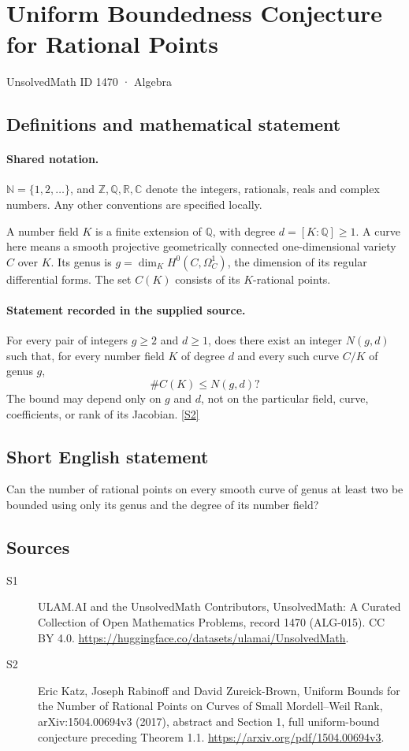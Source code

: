 \documentclass[11pt]{article}
\newcommand{\sref}[2]{\hyperlink{source:#1:#2}{[S#2]}}
\begin{document}
\setcounter{section}{1469}
\section{Uniform Boundedness Conjecture for Rational Points}\label{1470}
{\small\sffamily UnsolvedMath ID 1470 · Algebra}
\subsection{Definitions and mathematical statement}

\paragraph{Shared notation.}$\mathbb N=\{1,2,\ldots\}$, and $\mathbb Z,\mathbb Q,\mathbb R,\mathbb C$ denote the integers, rationals, reals and complex numbers. Any other conventions are specified locally.


A number field $K$ is a finite extension of $\mathbb Q$, with degree $d=[K:\mathbb Q]\ge1$. A curve here means a smooth projective geometrically connected one-dimensional variety $C$ over $K$. Its genus is $g=\dim_K H^0(C,\Omega_C^1)$, the dimension of its regular differential forms. The set $C(K)$ consists of its $K$-rational points.
\paragraph{Statement recorded in the supplied source.}
For every pair of integers $g\ge2$ and $d\ge1$, does there exist an integer $N(g,d)$ such that, for every number field $K$ of degree $d$ and every such curve $C/K$ of genus $g$,
\[
 \#C(K)\le N(g,d)?
\]
The bound may depend only on $g$ and $d$, not on the particular field, curve, coefficients, or rank of its Jacobian. \sref{1470}{2}
\subsection{Short English statement}
Can the number of rational points on every smooth curve of genus at least two be bounded using only its genus and the degree of its number field?
\subsection{Sources}
\begin{description}
\item[\hypertarget{source:1470:1}{S1}] ULAM.AI and the UnsolvedMath Contributors, UnsolvedMath: A Curated Collection of Open Mathematics Problems, record 1470 (ALG-015). CC BY 4.0. \url{https://huggingface.co/datasets/ulamai/UnsolvedMath}.
\item[\hypertarget{source:1470:2}{S2}] Eric Katz, Joseph Rabinoff and David Zureick-Brown, Uniform Bounds for the Number of Rational Points on Curves of Small Mordell–Weil Rank, arXiv:1504.00694v3 (2017), abstract and Section 1, full uniform-bound conjecture preceding Theorem 1.1. \url{https://arxiv.org/pdf/1504.00694v3}.
\end{description}
\label{end:1470}
\end{document}
